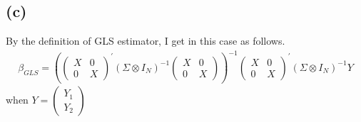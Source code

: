 \documentclass{article}
\begin{document}
\subsection{(c)}
By the definition of GLS estimator, I get in this case as follows.
\begin{align*}
	\beta_{GLS} = \left(\left(\begin{array}{cc} X & 0 \\ 0 & X \end{array}\right)^{'} \left(\Sigma \otimes I_N \right)^{-1} \left(\begin{array}{cc} X & 0 \\ 0 & X \end{array}\right)\right)^{-1} \left(\begin{array}{cc} X & 0 \\ 0 & X \end{array}\right)^{'} \left(\Sigma \otimes I_N \right)^{-1} Y
\end{align*}
when $Y = \left(\begin{array}{cc} Y_1\\Y_2 \end{array}\right)$
\end{document}

